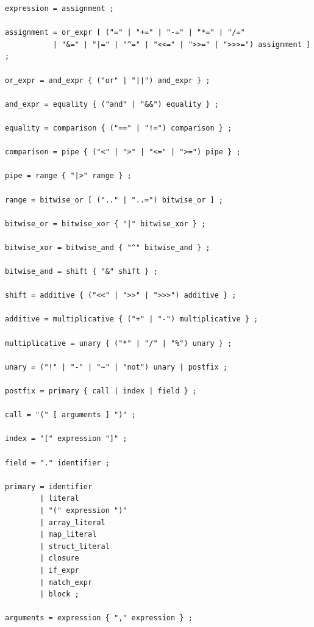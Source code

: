 \begin{lstlisting}[language=EBNF]
expression = assignment ;

assignment = or_expr [ ("=" | "+=" | "-=" | "*=" | "/="
           | "&=" | "|=" | "^=" | "<<=" | ">>=" | ">>>=") assignment ] ;

or_expr = and_expr { ("or" | "||") and_expr } ;

and_expr = equality { ("and" | "&&") equality } ;

equality = comparison { ("==" | "!=") comparison } ;

comparison = pipe { ("<" | ">" | "<=" | ">=") pipe } ;

pipe = range { "|>" range } ;

range = bitwise_or [ (".." | "..=") bitwise_or ] ;

bitwise_or = bitwise_xor { "|" bitwise_xor } ;

bitwise_xor = bitwise_and { "^" bitwise_and } ;

bitwise_and = shift { "&" shift } ;

shift = additive { ("<<" | ">>" | ">>>") additive } ;

additive = multiplicative { ("+" | "-") multiplicative } ;

multiplicative = unary { ("*" | "/" | "%") unary } ;

unary = ("!" | "-" | "~" | "not") unary | postfix ;

postfix = primary { call | index | field } ;

call = "(" [ arguments ] ")" ;

index = "[" expression "]" ;

field = "." identifier ;

primary = identifier
        | literal
        | "(" expression ")"
        | array_literal
        | map_literal
        | struct_literal
        | closure
        | if_expr
        | match_expr
        | block ;

arguments = expression { "," expression } ;
\end{lstlisting}
